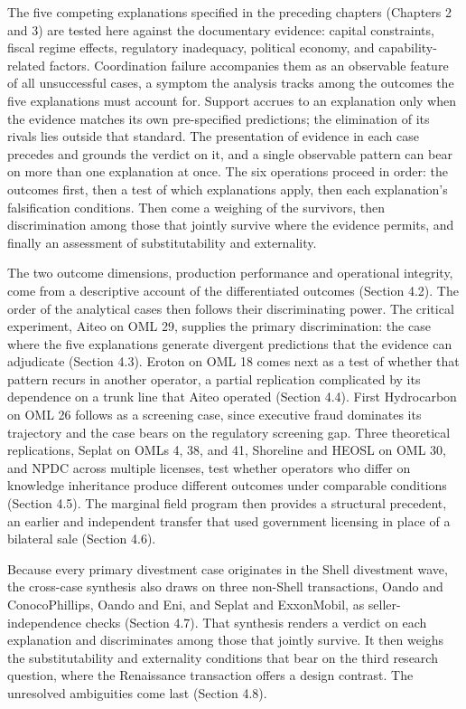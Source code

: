 \documentclass[twoside,fontset=lmodern]{mitthesis}
\begin{document}
The five competing explanations specified in the preceding chapters
(Chapters 2 and 3) are tested here against the documentary evidence:
capital constraints, fiscal regime effects, regulatory inadequacy,
political economy, and capability-related factors. Coordination failure
accompanies them as an observable feature of all unsuccessful cases, a
symptom the analysis tracks among the outcomes the five explanations
must account for. Support accrues to an explanation only when the
evidence matches its own pre-specified predictions; the elimination of
its rivals lies outside that standard. The presentation of evidence in
each case precedes and grounds the verdict on it, and a single
observable pattern can bear on more than one explanation at once. The
six operations proceed in order: the outcomes first, then a test of
which explanations apply, then each explanation's falsification
conditions. Then come a weighing of the survivors, then discrimination
among those that jointly survive where the evidence permits, and finally
an assessment of substitutability and externality.

The two outcome dimensions, production performance and operational
integrity, come from a descriptive account of the differentiated
outcomes (Section 4.2). The order of the analytical cases then follows
their discriminating power. The critical experiment, Aiteo on OML 29,
supplies the primary discrimination: the case where the five
explanations generate divergent predictions that the evidence can
adjudicate (Section 4.3). Eroton on OML 18 comes next as a test of
whether that pattern recurs in another operator, a partial replication
complicated by its dependence on a trunk line that Aiteo operated
(Section 4.4). First Hydrocarbon on OML 26 follows as a screening case,
since executive fraud dominates its trajectory and the case bears on the
regulatory screening gap. Three theoretical replications, Seplat on OMLs
4, 38, and 41, Shoreline and HEOSL on OML 30, and NPDC across multiple
licenses, test whether operators who differ on knowledge inheritance
produce different outcomes under comparable conditions (Section 4.5).
The marginal field program then provides a structural precedent, an
earlier and independent transfer that used government licensing in place
of a bilateral sale (Section 4.6).

Because every primary divestment case originates in the Shell divestment
wave, the cross-case synthesis also draws on three non-Shell
transactions, Oando and ConocoPhillips, Oando and Eni, and Seplat and
ExxonMobil, as seller-independence checks (Section 4.7). That synthesis
renders a verdict on each explanation and discriminates among those that
jointly survive. It then weighs the substitutability and externality
conditions that bear on the third research question, where the
Renaissance transaction offers a design contrast. The unresolved
ambiguities come last (Section 4.8).
\end{document}
